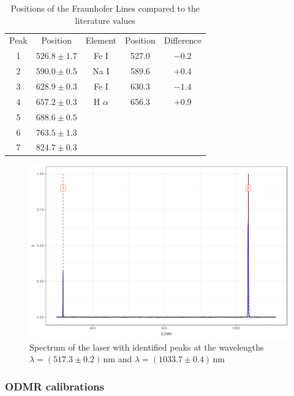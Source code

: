 \begin{table}
	\centering
	\begin{tabular}{c|c|c|c|c}
		Peak&Position&Element&Position \cite{fraunhoferlines}&Difference\\
		1&$526.8\pm1.7$&Fe I&527.0&$-0.2$\\
		2&$590.0\pm0.5$&Na I&589.6&$+0.4$\\
		3&$628.9\pm0.3$&Fe I&630.3&$-1.4$\\
		4&$657.2\pm0.3$&H $\alpha$&656.3&$+0.9$\\
		5&$688.6\pm0.5$&&&\\
		6&$763.5\pm1.3$&&&\\
		7&$824.7\pm0.3$&&&\\
	\end{tabular}
	\caption{Positions of the Fraunhofer Lines compared to the literature values}
	\label{tab:fraunhofer}
\end{table}

\begin{figure}
	\centering
	\includegraphics[width=\textwidth]{../figures/laserspectrum.png}
	\caption[Spectrum of the laser]{Spectrum of the laser with identified peaks at the wavelengths $\lambda=(517.3\pm0.2)\,\mathrm{nm}$ and $\lambda=(1033.7\pm0.4)\,\mathrm{nm}$}
	\label{fig:laserspectrum}
\end{figure}

\subsubsection{ODMR calibrations}
